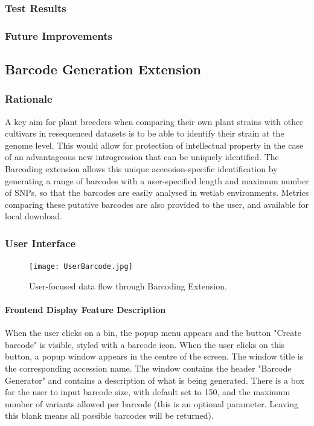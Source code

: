 \documentclass[12pt]{article}
\begin{document}
\begin{itemize}
\subsubsection{Test Results}
\subsubsection{Future Improvements}


\subsection{Barcode Generation Extension}
\subsubsection{Rationale}
A key aim for plant breeders when comparing their own plant strains with other cultivars in resequenced datasets is to be able to identify their strain at the genome level. This would allow for protection of intellectual property in the case of an advantageous new introgression that can be uniquely identified. The Barcoding extension allows this unique accession-specific identification by generating a range of barcodes with a user-specified length and maximum number of SNPs, so that the barcodes are easily analysed in wetlab environments. Metrics comparing these putative barcodes are also provided to the user, and available for local download. 

\subsubsection{User Interface}

\begin{figure}[h]
    \centering
    \texttt{[image: UserBarcode.jpg]}
    \caption{User-focused data flow through Barcoding Extension.}
\end{figure}
\paragraph{Frontend Display Feature Description}
When the user clicks on a bin, the popup menu appears and the button "Create barcode" is visible, styled with a barcode icon. When the user clicks on this button, a popup window appears in the centre of the screen. The window title is the corresponding accession name. The window contains the header "Barcode Generator" and contains a description of what is being generated. There is a box for the user to input barcode size, with default set to 150, and the maximum number of variants allowed per barcode (this is an optional parameter. Leaving this blank means all possible barcodes will be returned).  


\end{itemize}
\end{document}
